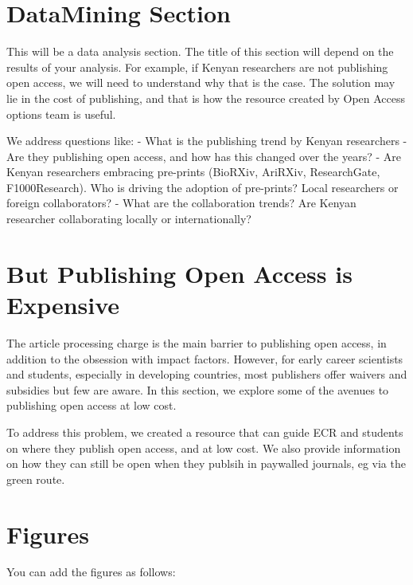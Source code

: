 \section*{DataMining Section}\label{datamining-section}

This will be a data analysis section. The title of this section will
depend on the results of your analysis. For example, if Kenyan
researchers are not publishing open access, we will need to understand
why that is the case. The solution may lie in the cost of publishing,
and that is how the resource created by Open Access options team is
useful.

We address questions like: - What is the publishing trend by Kenyan
researchers - Are they publishing open access, and how has this changed
over the years? - Are Kenyan researchers embracing pre-prints (BioRXiv,
AriRXiv, ResearchGate, F1000Research). Who is driving the adoption of
pre-prints? Local researchers or foreign collaborators? - What are the
collaboration trends? Are Kenyan researcher collaborating locally or
internationally?

\section*{But Publishing Open Access is
Expensive}\label{but-publishing-open-access-is-expensive}

The article processing charge is the main barrier to publishing open
access, in addition to the obsession with impact factors. However, for
early career scientists and students, especially in developing
countries, most publishers offer waivers and subsidies but few are
aware. In this section, we explore some of the avenues to publishing
open access at low cost.

To address this problem, we created a resource that can guide ECR and
students on where they publish open access, and at low cost. We also
provide information on how they can still be open when they publsih in
paywalled journals, eg via the green route.

\section*{Figures}\label{figures}

You can add the figures as follows:


